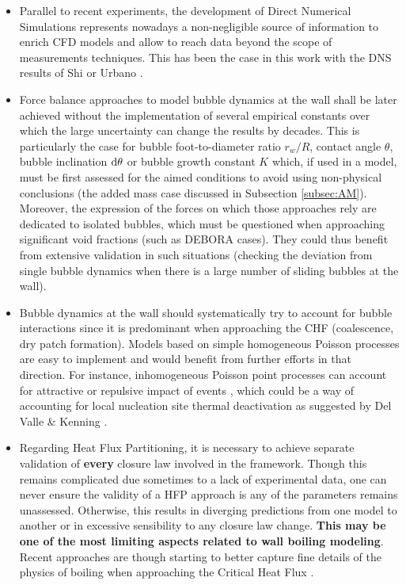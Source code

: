 \begin{itemize}

\item Parallel to recent experiments, the development of Direct Numerical Simulations represents nowadays a non-negligible source of information to enrich CFD models and allow to reach data beyond the scope of measurements techniques. This has been the case in this work with the DNS results of Shi \etal \cite{shi_drag_2021} or Urbano \etal \cite{urbano_direct_2018}.

\item Force balance approaches to model bubble dynamics at the wall shall be later achieved without the implementation of several empirical constants over which the large uncertainty can change the results by decades. This is particularly the case for bubble foot-to-diameter ratio $r_{w}/R$, contact angle $\theta$, bubble inclination $\mathrm{d}\theta$ or bubble growth constant $K$ which, if used in a model, must be first assessed for the aimed conditions to avoid using non-physical conclusions (\eg the added mass case discussed in Subsection \ref{subsec:AM}). Moreover, the expression of the forces on which those approaches rely are dedicated to isolated bubbles, which must be questioned when approaching significant void fractions (such as DEBORA cases). They could thus benefit from extensive validation in such situations (\eg checking the deviation from single bubble dynamics when there is a large number of sliding bubbles at the wall).


\item Bubble dynamics at the wall should systematically try to account for bubble interactions since it is predominant when approaching the CHF (\eg coalescence, dry patch formation). Models based on simple homogeneous Poisson processes are easy to implement and would benefit from further efforts in that direction. For instance, inhomogeneous Poisson point processes can account for attractive or repulsive impact of events \cite{daley_introduction_2003}, which could be a way of accounting for local nucleation site thermal deactivation as suggested by Del Valle \& Kenning \cite{del_valle_subcooled_1985}.

\item Regarding Heat Flux Partitioning, it is necessary to achieve separate validation of \textbf{every} closure law involved in the framework. Though this remains complicated due sometimes to a lack of experimental data, one can never ensure the validity of a HFP approach is any of the parameters remains unassessed. Otherwise, this results in diverging predictions from one model to another or in excessive sensibility to any closure law change. \textbf{This may be one of the most limiting aspects related to wall boiling modeling}. Recent approaches are though starting to better capture fine details of the physics of boiling when approaching the Critical Heat Flux \cite{baglietto_boiling_2019}.


\end{itemize}
